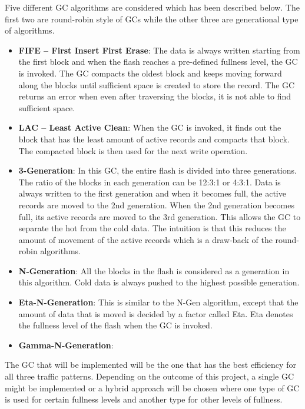 Five different GC algorithms are considered which has been described below. The first two are round-robin style of GCs while the other three are generational type of algorithms.
\begin{itemize}
\item {\bf FIFE – First Insert First Erase}:
The data is always written starting from the first block and when the flash reaches a pre-defined fullness level, the GC is invoked. The GC compacts the oldest block and keeps moving forward along the blocks until sufficient space is created to store the record. The GC returns an error when even after traversing the blocks, it is not able to find sufficient space. 
\item {\bf LAC – Least Active Clean}:
When the GC is invoked, it finds out the block that has the least amount of active records and compacts that block. The compacted block is then used for the next write operation.
\item {\bf 3-Generation}:
In this GC, the entire flash is divided into three generations. The ratio of the blocks in each generation can be 12:3:1 or 4:3:1. Data is always written to the first generation and when it becomes full, the active records are moved to the 2nd generation. When the 2nd generation becomes full, its active records are moved to the 3rd generation. This allows the GC to separate the hot from the cold data. The intuition is that this reduces the amount of movement of the active records which is a draw-back of the round-robin algorithms.
\item {\bf N-Generation}:
All the blocks in the flash is considered as a generation in this algorithm. Cold data is always pushed to the highest possible generation.
\item {\bf Eta-N-Generation}:
This is similar to the N-Gen algorithm, except that the amount of data that is moved is decided by a factor called Eta. Eta denotes the fullness level of the flash when the GC is invoked.
\item {\bf Gamma-N-Generation}:
\end{itemize}	


The GC that will be implemented will be the one that has the best efficiency for all three traffic patterns. Depending on the outcome of this project, a single GC might be implemented or a hybrid approach will be chosen where one type of GC is used for certain fullness levels and another type for other levels of fullness.

